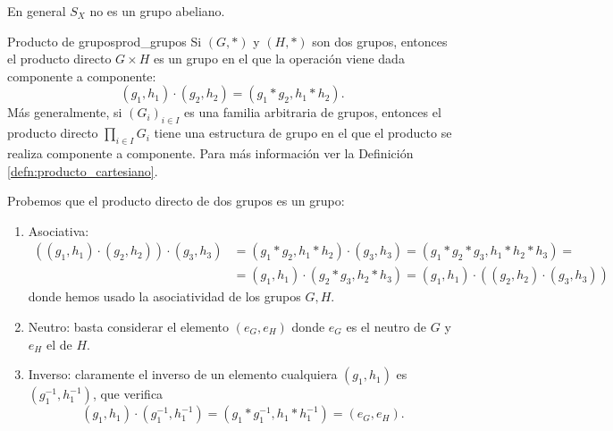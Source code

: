 \begin{remark}
    En general $S_X$ no es un grupo abeliano.
\end{remark}

\begin{example}{Producto de grupos}{prod_grupos}
    Si \((G, *)\) y \((H, *)\) son dos grupos, entonces el {producto directo} \(G \times H\) es un grupo en el que la operación viene dada componente a componente:
    \[
    (g_1, h_1) \cdot (g_2, h_2) = (g_1 * g_2, h_1 * h_2).
    \]
    Más generalmente, si \((G_i)_{i\in I}\) es una familia arbitraria de grupos, entonces el producto directo \(\prod_{i\in I} G_i\) tiene una estructura de grupo en el que el producto se realiza componente a componente. Para más información ver la Definición \ref{defn:producto_cartesiano}.
\end{example}

Probemos que el producto directo de dos grupos es un grupo:

\begin{proofbox}
    \begin{enumerate}
        \item Asociativa:
        \begin{align*}
            ((g_1, h_1) \cdot (g_2, h_2)) \cdot (g_3, h_3) &= (g_1 * g_2, h_1 * h_2) \cdot (g_3, h_3) = (g_1 * g_2 * g_3, h_1 * h_2 * h_3) = \\
            &= (g_1, h_1) \cdot (g_2 * g_3, h_2 * h_3) = (g_1, h_1) \cdot ((g_2, h_2) \cdot (g_3, h_3))
        \end{align*}
        donde hemos usado la asociatividad de los grupos $G, H$.
        \item Neutro: basta considerar el elemento $(e_G, e_H)$ donde $e_G$ es el neutro de $G$ y $e_H$ el de $H$.
        \item Inverso: claramente el inverso de un elemento cualquiera $(g_1, h_1)$ es $(g_1^{-1}, h_1^{-1})$, que verifica
        \[
        (g_1, h_1) \cdot (g_1^{-1}, h_1^{-1}) = (g_1 * g_1^{-1}, h_1 * h_1^{-1}) = (e_G, e_H).
        \]
    \end{enumerate}
\end{proofbox}

